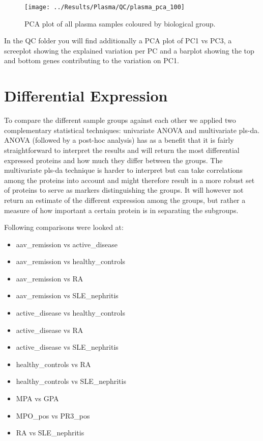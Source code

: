 \documentclass[
]{book}
\providecommand{\tightlist}{%
  \setlength{\itemsep}{0pt}\setlength{\parskip}{0pt}}
\begin{document}
\begin{figure}

{\centering \texttt{[image: ../Results/Plasma/QC/plasma\_pca\_100]} 

}

\caption{PCA plot of all plasma samples coloured by biological group.}\label{fig:plPCA}
\end{figure}

In the QC folder you will find additionally a PCA plot of PC1 vs PC3, a
screeplot showing the explained variation per PC and a barplot showing the top
and bottom genes contributing to the variation on PC1.

\hypertarget{differential-expression}{%
\chapter{Differential Expression}\label{differential-expression}}

To compare the different sample groups against each other we applied two
complementary statistical techniques: univariate ANOVA and multivariate pls-da.
ANOVA (followed by a post-hoc analysis) has as a benefit that it is fairly
straightforward to interpret the results and will return the most differential expressed
proteins and how much they differ between the groups. The multivariate pls-da
technique is harder to interpret but can take correlations among the proteins
into account and might therefore result in a more robust set of proteins to
serve as markers distinguishing the groups. It will however not return an
estimate of the different expression among the groups, but rather a measure of
how important a certain protein is in separating the subgroups.

Following comparisons were looked at:

\begin{itemize}
\tightlist
\item
  aav\_remission vs active\_disease
\item
  aav\_remission vs healthy\_controls
\item
  aav\_remission vs RA
\item
  aav\_remission vs SLE\_nephritis
\item
  active\_disease vs healthy\_controls
\item
  active\_disease vs RA
\item
  active\_disease vs SLE\_nephritis
\item
  healthy\_controls vs RA
\item
  healthy\_controls vs SLE\_nephritis
\item
  MPA vs GPA
\item
  MPO\_pos vs PR3\_pos
\item
  RA vs SLE\_nephritis
\end{itemize}
\end{document}
